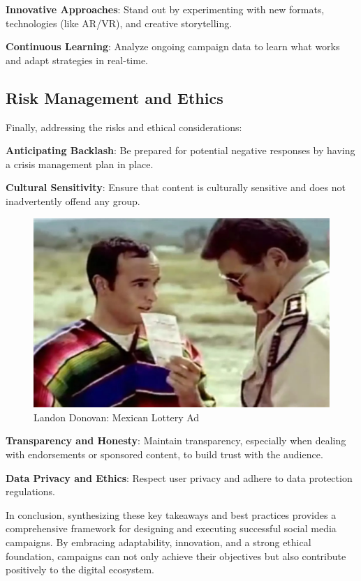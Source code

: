 \documentclass[
]{book}
\begin{document}
\textbf{Innovative Approaches}: Stand out by experimenting with new formats, technologies (like AR/VR), and creative storytelling.

\textbf{Continuous Learning}: Analyze ongoing campaign data to learn what works and adapt strategies in real-time.

\hypertarget{risk-management-and-ethics}{%
\subsection{Risk Management and Ethics}\label{risk-management-and-ethics}}

Finally, addressing the risks and ethical considerations:

\textbf{Anticipating Backlash}: Be prepared for potential negative responses by having a crisis management plan in place.

\textbf{Cultural Sensitivity}: Ensure that content is culturally sensitive and does not inadvertently offend any group.

\begin{figure}
\centering
\includegraphics[width=1\textwidth,height=\textheight]{images/lottery-mexico.jpg}
\caption{Landon Donovan: Mexican Lottery Ad}
\end{figure}

\textbf{Transparency and Honesty}: Maintain transparency, especially when dealing with endorsements or sponsored content, to build trust with the audience.

\textbf{Data Privacy and Ethics}: Respect user privacy and adhere to data protection regulations.

In conclusion, synthesizing these key takeaways and best practices provides a comprehensive framework for designing and executing successful social media campaigns. By embracing adaptability, innovation, and a strong ethical foundation, campaigns can not only achieve their objectives but also contribute positively to the digital ecosystem.
\end{document}
